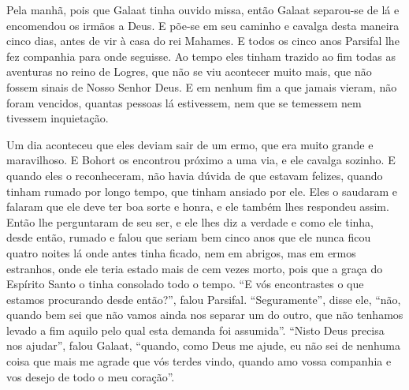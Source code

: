 Pela manhã, pois que Galaat tinha ouvido missa, então Galaat separou-se de lá e
encomendou os irmãos a Deus. E põe-se em seu caminho e cavalga desta maneira
cinco dias, antes de vir à casa do rei Mahames. E todos os cinco anos Parsifal
lhe fez companhia para onde seguisse. Ao tempo eles tinham trazido ao fim todas
as aventuras no reino de Logres, que não se viu acontecer muito mais, que não
fossem sinais de Nosso Senhor Deus. E em nenhum fim a que jamais vieram, não
foram vencidos, quantas pessoas lá estivessem, nem que se temessem nem tivessem
inquietação. 

Um dia aconteceu que eles deviam sair de um ermo, que era muito grande e
maravilhoso. E Bohort os encontrou próximo a uma via, e ele cavalga sozinho. E
quando eles o reconheceram, não havia dúvida de que estavam felizes, quando
tinham rumado por longo tempo, que tinham ansiado por ele. Eles o saudaram e
falaram que ele deve ter boa sorte e honra, e ele também lhes respondeu assim.
Então lhe perguntaram de seu ser, e ele lhes diz a verdade e como ele tinha,
desde então, rumado e falou que seriam bem cinco anos que ele nunca ficou
quatro noites lá onde antes tinha ficado, nem em abrigos, mas em ermos
estranhos, onde ele teria estado mais de cem vezes morto, pois que a graça do
Espírito Santo o tinha consolado todo o tempo. “E vós encontrastes o que
estamos procurando desde então?”, falou Parsifal. “Seguramente”, disse ele,
“não, quando bem sei que não vamos ainda nos separar um do outro, que não
tenhamos levado a fim aquilo pelo qual esta demanda foi assumida”. “Nisto Deus
precisa nos ajudar”, falou Galaat, “quando, como Deus me ajude, eu não sei de
nenhuma coisa que mais me agrade que vós terdes vindo, quando amo vossa
companhia e vos desejo de todo o meu coração”. 

